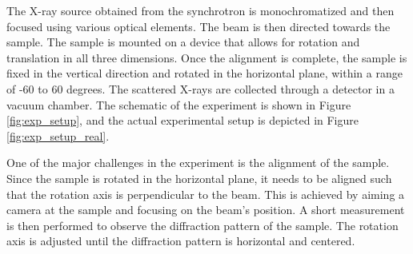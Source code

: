 The X-ray source obtained from the synchrotron is monochromatized and then focused using
various optical elements. The beam is then directed towards the sample. The 
sample is mounted on a device that allows for rotation and translation in all 
three dimensions. Once the alignment is complete, the sample is fixed in the
vertical direction and rotated in the horizontal plane, within a range of -60
to 60 degrees. The scattered X-rays are collected through a detector in a 
vacuum chamber. The schematic of the experiment is shown in Figure \ref{fig:exp_setup},
and the actual experimental setup is depicted in Figure \ref{fig:exp_setup_real}.

\medskip

One of the major challenges in the experiment is the alignment of the sample. 
Since the sample is rotated in the horizontal plane, it needs to be aligned 
such that the rotation axis is perpendicular to the beam. This is achieved by 
aiming a camera at the sample and focusing on the beam's position. A short 
measurement is then performed to observe the diffraction pattern of the sample.
 The rotation axis is adjusted until the diffraction pattern is horizontal and 
 centered.

